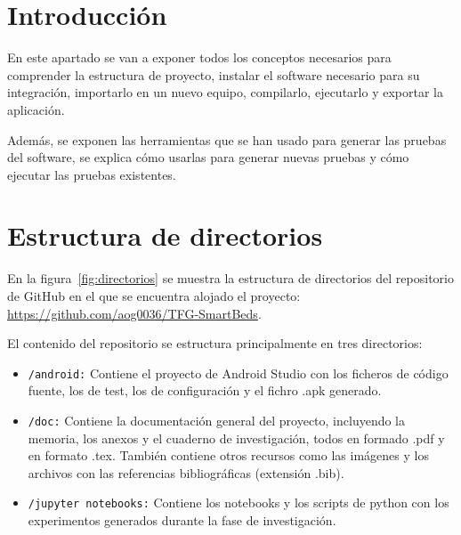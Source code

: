 
\section{Introducción}

En este apartado se van a exponer todos los conceptos necesarios para comprender la estructura de proyecto, instalar el software necesario para su integración, importarlo en un nuevo equipo, compilarlo, ejecutarlo y exportar la aplicación. 

Además, se exponen las herramientas que se han usado para generar las pruebas del software, se explica cómo usarlas para generar nuevas pruebas y cómo ejecutar las pruebas existentes. 

\section{Estructura de directorios}

En la figura~\ref{fig:directorios} se muestra la estructura de directorios del repositorio de GitHub en el que se encuentra alojado el proyecto: \url{https://github.com/aog0036/TFG-SmartBeds}. 

El contenido del repositorio se estructura principalmente en tres directorios: 
\begin{itemize}
	\item \texttt{/android:} Contiene el proyecto de Android Studio con los ficheros de código fuente, los de test, los de configuración y el fichro .apk generado. 
	\item \texttt{/doc:} Contiene la documentación general del proyecto, incluyendo la memoria, los anexos y el cuaderno de investigación, todos en formado .pdf y en formato .tex. También contiene otros recursos como las imágenes y los archivos con las referencias bibliográficas (extensión .bib). 
	\item \texttt{/jupyter notebooks:} Contiene los notebooks y los scripts de python con los experimentos generados durante la fase de investigación. 
\end{itemize}

